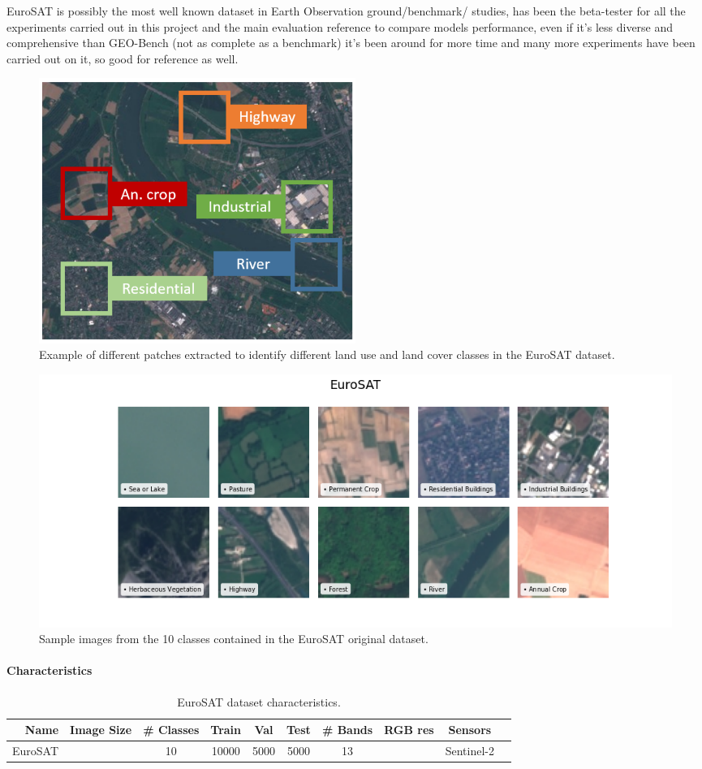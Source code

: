 \documentclass[a4paper, oneside, english]{sapthesis}
\begin{document}
EuroSAT \cite{helber2019eurosat} is possibly the most well known dataset in Earth Observation ground/benchmark/ studies, has been the beta-tester for all the experiments carried out in this project and the main evaluation reference to compare models performance, even if it's less diverse and comprehensive than GEO-Bench (not as complete as a benchmark) it's been around for more time and many more experiments have been carried out on it, so good for reference as well.

\begin{figure}[h]
    \centering
    \includegraphics[width=0.5\textwidth]{img/EuroSAT_paper.png}
    \caption{Example of different patches extracted to identify different land use and land cover classes in the EuroSAT dataset.}
    \label{fig:eurosatds}
\end{figure}


\begin{figure}[h]
    \centering
    \includegraphics[width=\textwidth]{img/EuroSAT_image_grid.png}
    \caption{Sample images from the 10 classes contained in the EuroSAT original dataset.}
    \label{fig:eurosatgrid}
\end{figure}


\paragraph{Characteristics}


\begin{table}[ht]
\centering
\footnotesize
\renewcommand{\arraystretch}{1.2}
    \begin{tabular}{rcccccclcl}
    \toprule
    Name & Image Size & \# Classes & Train & Val & Test & \# Bands & RGB res & Sensors  \\
    \midrule
    EuroSAT & & 10 & 10000 & 5000 & 5000 & 13 & & Sentinel-2 \\
    \bottomrule
    \end{tabular}
\vspace{0.3cm}
\caption{\normalsize EuroSAT dataset characteristics.}
\label{tab:classtypes}
\end{table}
\end{document}
